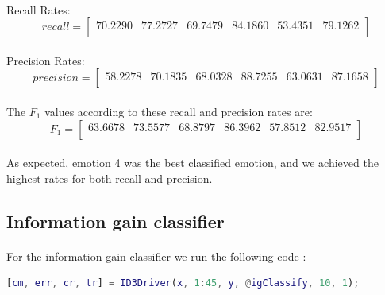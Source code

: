 \documentclass[a4paper,12pt,oneside,final]{report}
\begin{document}
\paragraph{}
Recall Rates:
\[
recall = \left[\begin{array}{cccccc}
70.2290   &77.2727  & 69.7479  & 84.1860 &  53.4351&   79.1262 \\

\end{array}
\right]
\]
\paragraph{}
Precision Rates:
\[
precision = \left[\begin{array}{cccccc}
58.2278 &  70.1835  & 68.0328  & 88.7255  & 63.0631 &  87.1658 \\
\end{array}
\right]
\]
\paragraph{}
The $F_{1}$ values according to these recall and precision rates are: 
\[
F_{1} = \left[\begin{array}{cccccc}
63.6678 &  73.5577 &  68.8797 &  86.3962 &  57.8512 &  82.9517 \\
\end{array}
\right]
\]
\paragraph{}
As expected, emotion 4 was the best classified emotion, and we achieved the highest rates for both recall and precision.
\subsection{Information gain classifier}
\paragraph{}
For the information gain classifier we run the following code :
\newline
\begin{lstlisting}[language=MATLAB, frame=single]
[cm, err, cr, tr] = ID3Driver(x, 1:45, y, @igClassify, 10, 1);
\end{lstlisting}
\end{document}
